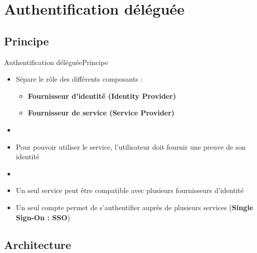 \documentclass{beamer}
\begin{document}
\section{Authentification déléguée}

\subsection{Principe}

\begin{frame}{Authentification déléguée}{Principe}
  \begin{center}
    \begin{itemize}
      \item Sépare le rôle des différents composants :
      \begin{itemize}
        \item \textbf{Fournisseur d'identité (Identity Provider)}
        \item \textbf{Fournisseur de service (Service Provider)}
      \end{itemize}
      \item[~]
      \item Pour pouvoir utiliser le service, l'utilisateur doit fournir une preuve de son identité
      \item[~]
      \item Un seul service peut être compatible avec plusieurs fournisseurs d'identité
      \item Un seul compte permet de s'authentifier auprès de plusieurs services (\textbf{Single Sign-On : SSO})
    \end{itemize}
  \end{center}
\end{frame}

\subsection{Architecture}
\end{document}
